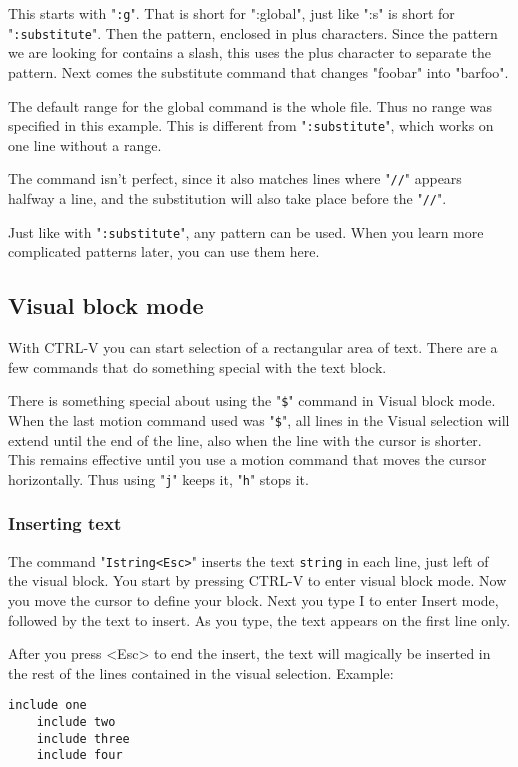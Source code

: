{This starts with "\texttt{:g}".
That is short for ":global", just like ":s" is short for "\texttt{:substitute}".
Then the pattern, enclosed in plus characters.
Since the pattern we are looking for contains a slash, this uses the plus character to separate the pattern.
Next comes the substitute command that changes "foobar" into "barfoo".

The default range for the global command is the whole file.
Thus no range was specified in this example.
This is different from "\texttt{:substitute}", which works on one line without a range.

The command isn't perfect, since it also matches lines where "\texttt{//}" appears halfway a line, and the substitution will also take place before the "\texttt{//}".

Just like with "\texttt{:substitute}", any pattern can be used.
When you learn more complicated patterns later, you can use them here.
\subsection{Visual block mode}
With CTRL-V you can start selection of a rectangular area of text.
There are a few commands that do something special with the text block.

There is something special about using the "\texttt{\$}" command in Visual block mode.
When the last motion command used was "\texttt{\$}", all lines in the Visual selection will extend until the end of the line, also when the line with the cursor is shorter.
This remains effective until you use a motion command that moves the cursor horizontally.
Thus using "\texttt{j}" keeps it, "\texttt{h}" stops it.

\subsubsection{Inserting text}
The command  "\texttt{I{string}<Esc>}" inserts the text \texttt{{string}} in each line, just left of the visual block.
You start by pressing CTRL-V to enter visual block mode.
Now you move the cursor to define your block.
Next you type I to enter Insert mode, followed by the text to insert.
As you type, the text appears on the first line only.

After you press <Esc> to end the insert, the text will magically be inserted in the rest of the lines contained in the visual selection.
Example:

\begin{Verbatim}[samepage=true]
    include one 
    include two 
    include three 
    include four 
\end{Verbatim}

}
